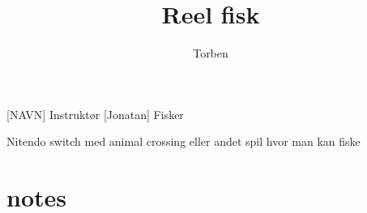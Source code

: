 \documentclass[a4paper,11pt]{article}
\title{Reel fisk}
\author{Torben}
\begin{document}
\maketitle

\begin{roles}
[NAVN] Instruktør
 [Jonatan] Fisker
\end{roles}

\begin{props}
Nitendo switch med animal crossing eller andet spil hvor man kan fiske
\end{props}

\section*{notes}


\begin{sketch}
\end{sketch}
\end{document}
